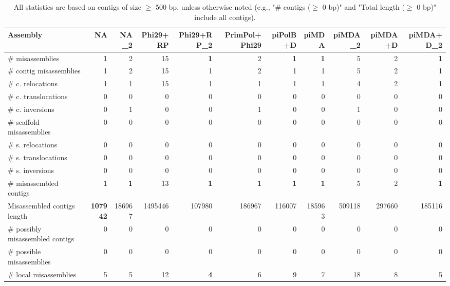 \documentclass[12pt,a4paper]{article}
\begin{document}
\begin{table}[ht]
\begin{center}
\caption{All statistics are based on contigs of size $\geq$ 500 bp, unless otherwise noted (e.g., "\# contigs ($\geq$ 0 bp)" and "Total length ($\geq$ 0 bp)" include all contigs).}
\begin{tabular}{|l*{10}{|r}|}
\hline
Assembly & NA & NA\_2 & Phi29+RP & Phi29+RP\_2 & PrimPol+Phi29 & piPolB+D & piMDA & piMDA\_2 & piMDA+D & piMDA+D\_2 \\ \hline
\# misassemblies & {\bf 1} & 2 & 15 & {\bf 1} & 2 & {\bf 1} & {\bf 1} & 5 & 2 & {\bf 1} \\ \hline
\hspace{2mm}\# contig misassemblies & 1 & 2 & 15 & 1 & 2 & 1 & 1 & 5 & 2 & 1 \\ \hline
\hspace{5mm}\# c. relocations & 1 & 1 & 15 & 1 & 1 & 1 & 1 & 4 & 2 & 1 \\ \hline
\hspace{5mm}\# c. translocations & 0 & 0 & 0 & 0 & 0 & 0 & 0 & 0 & 0 & 0 \\ \hline
\hspace{5mm}\# c. inversions & 0 & 1 & 0 & 0 & 1 & 0 & 0 & 1 & 0 & 0 \\ \hline
\hspace{2mm}\# scaffold misassemblies & 0 & 0 & 0 & 0 & 0 & 0 & 0 & 0 & 0 & 0 \\ \hline
\hspace{5mm}\# s. relocations & 0 & 0 & 0 & 0 & 0 & 0 & 0 & 0 & 0 & 0 \\ \hline
\hspace{5mm}\# s. translocations & 0 & 0 & 0 & 0 & 0 & 0 & 0 & 0 & 0 & 0 \\ \hline
\hspace{5mm}\# s. inversions & 0 & 0 & 0 & 0 & 0 & 0 & 0 & 0 & 0 & 0 \\ \hline
\# misassembled contigs & {\bf 1} & {\bf 1} & 13 & {\bf 1} & {\bf 1} & {\bf 1} & {\bf 1} & 5 & 2 & {\bf 1} \\ \hline
Misassembled contigs length & {\bf 107942} & 186967 & 1495446 & 107980 & 186967 & 116007 & 185963 & 509118 & 297660 & 185116 \\ \hline
\# possibly misassembled contigs & 0 & 0 & 0 & 0 & 0 & 0 & 0 & 0 & 0 & 0 \\ \hline
\hspace{5mm}\# possible misassemblies & 0 & 0 & 0 & 0 & 0 & 0 & 0 & 0 & 0 & 0 \\ \hline
\# local misassemblies & 5 & 5 & 12 & {\bf 4} & 6 & 9 & 7 & 18 & 8 & 5 \\ \hline

\end{tabular}
\end{center}
\end{table}
\end{document}
